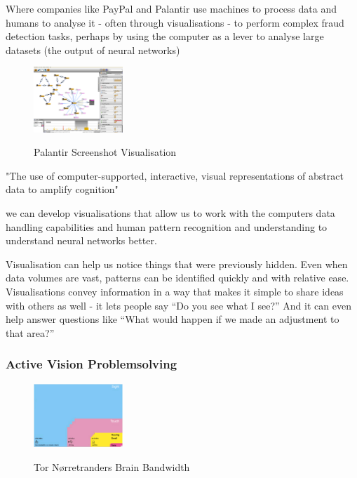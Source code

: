 \documentclass[a4paper,11pt,titlepage]{article}
\begin{document}
Where companies like PayPal and Palantir use machines to process data and humans to analyse it - often through visualisations - to perform complex fraud detection tasks, perhaps by using the computer as a lever to analyse large datasets (the output of neural networks) 


		\begin{figure}[H]
    			\centering	
			{{\includegraphics[width=0.3\textwidth]
    				{img/palantir_01.png} 
    			}}%
    			\caption{Palantir Screenshot Visualisation}%
    		\label{fig:Palantir}
		\end{figure}


"The use of computer-supported, interactive, visual representations of abstract data to amplify cognition" \cite{card1999}

we can develop visualisations that allow us to work with the computers data handling capabilities and human pattern recognition and understanding to understand neural networks better. 

Visualisation can help us notice things that were previously hidden. Even when data volumes are vast, patterns can be identified quickly and with relative ease. Visualisations convey information in a way that makes it simple to share ideas with others as well -  it lets people say “Do you see what I see?” And it can even help answer questions like “What would happen if we made an adjustment to that area?”


\subsubsection{Active Vision Problemsolving}
		
		\begin{figure}[H]
    			\centering	
			{{\includegraphics[width=0.3\textwidth]
    				{img/brain_bandwidth.png} 
    			}}%
    			\caption{Tor Nørretranders Brain Bandwidth}%
    		\label{fig:TufteExcellence}
		\end{figure}
\end{document}
